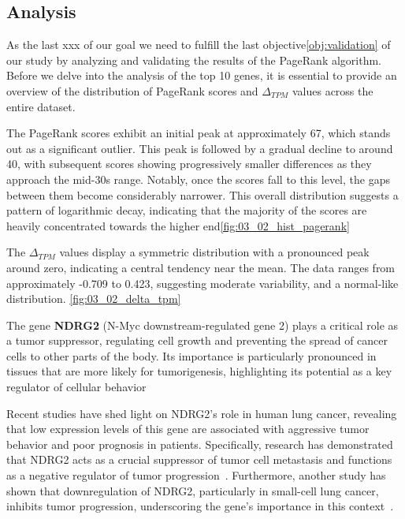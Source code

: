 \subsection{Analysis} \label{subsec:analysis}

As the last xxx of our goal we need to fulfill the last objective\ref{obj:validation} of our study by analyzing and
validating the results of the PageRank algorithm.
Before we delve into the analysis of the top 10 genes,
it is essential to provide an overview of the distribution of PageRank scores and $\Delta_{TPM}$ values across the entire dataset.

The PageRank scores exhibit an initial peak at approximately 67, which stands out as a significant outlier.
This peak is followed by a gradual decline to around 40, with subsequent scores showing progressively smaller differences
as they approach the mid-30s range.
Notably, once the scores fall to this level, the gaps between them become considerably narrower.
This overall distribution suggests a pattern of logarithmic decay,
indicating that the majority of the scores are heavily concentrated towards the higher end\ref{fig:03_02_hist_pagerank}

The $\Delta_{TPM}$ values display a symmetric distribution with a pronounced peak around zero, indicating a central tendency near the mean.
The data ranges from approximately -0.709 to 0.423, suggesting moderate variability, and a normal-like distribution.
\ref{fig:03_02_delta_tpm}
\newline


The gene \textbf{NDRG2} (N-Myc downstream-regulated gene 2) plays a critical role as a tumor suppressor,
regulating cell growth and preventing the spread of cancer cells to other parts of the body.
Its importance is particularly pronounced in tissues that are more likely for tumorigenesis,
highlighting its potential as a key regulator of cellular behavior~\cite{Lee2022NDRG2}

Recent studies have shed light on NDRG2's role in human lung cancer,
revealing that low expression levels of this gene are associated with aggressive tumor behavior and poor prognosis in patients.
Specifically, research has demonstrated that NDRG2 acts as a crucial suppressor of tumor cell metastasis and
functions as a negative regulator of tumor progression~\cite{Li2013NDRG2}.
Furthermore, another study has shown that downregulation of NDRG2, particularly in small-cell lung cancer,
inhibits tumor progression, underscoring the gene's importance in this context~\cite{Ma2024NDRG2}.

